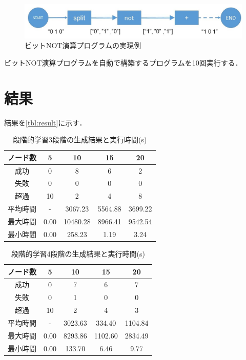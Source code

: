 \documentclass[exploratorypaper]{jsaiart} %
\begin{document}
\begin{figure}[t]
    \begin{center}
        \includegraphics[width=120mm]{bitwise_not.jpg}
    \end{center}
    \capwidth=90mm %
    \caption{ビットNOT演算プログラムの実現例}
    \label{fig:bitwise_not}
\end{figure}

ビットNOT演算プログラムを自動で構築するプログラムを10回実行する．
\section{結果}
結果を\ref{tbl:result}に示す．


\begin{table}[t]
\caption{段階的学習3段階の生成結果と実行時間(s)}
\label{tbl:result1}
\begin{tabular}{c|cccc}
    ノード数&	5&	10&	15&	20\\
    \hline
    成功&	0&	8&	6&	2\\
    失敗&	0&	0&	0&	0\\
    超過&	10&	2&	4&	8\\
    \hline \hline
    平均時間&	- &	3067.23&	5564.88&	3699.22\\
    最大時間&	0.00&	10480.28&	8966.41&	9542.54\\
    最小時間&	0.00&	258.23&	1.19&	3.24\\
    \hline
\end{tabular}
\end{table}

\begin{table}[t]
\caption{段階的学習4段階の生成結果と実行時間(s)}
\label{tbl:result2}
\begin{tabular}{c|cccc}
    ノード数&	5&	10&	15&	20\\
    \hline
    成功&	0&	7&	6&	7\\
    失敗&	0&	1&	0&	0\\
    超過&	10&	2&	4&	3\\
    \hline \hline
    平均時間&	-&	3023.63&	334.40&	1104.84\\
    最大時間&	0.00&	8293.86&	1102.60&	2834.49\\
    最小時間&	0.00&	133.70&	6.46&	9.77\\
    \hline
\end{tabular}
\end{table}
\end{document}
